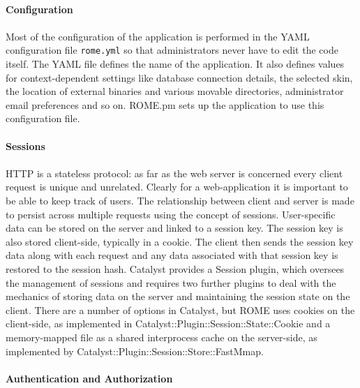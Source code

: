 \paragraph{Configuration}
\paragraph{}
Most of the configuration of the application is performed in the YAML configuration file \texttt{rome.yml} so that administrators never have to edit the code itself. The YAML file defines the name of the application. It also defines values for context-dependent settings like database connection details, the selected skin, the location of external binaries and various movable directories, administrator email preferences and so on. ROME.pm sets up the application to use this configuration file.



\paragraph{Sessions}
\paragraph{}
HTTP is a stateless protocol: as far as the web server is concerned every client request is unique and unrelated. Clearly for a web-application it is important to be able to keep track of users. The relationship between client and server is made to persist across multiple requests using the concept of sessions. User-specific data can be stored on the server and linked to a session key. The session key is also stored client-side, typically in a cookie. The client then sends the session key data along with each request and any data associated with that session key is restored to the session hash. Catalyst provides a Session plugin, which oversees the management of sessions and requires two further plugins to deal with the mechanics of storing data on the server and maintaining the session state on the client. There are a number of options in Catalyst, but ROME uses cookies on the client-side, as implemented in Catalyst::Plugin::Session::State::Cookie and a memory-mapped file as a shared interprocess cache on the server-side, as implemented by Catalyst::Plugin::Session::Store::FastMmap.


\paragraph{Authentication and Authorization}

